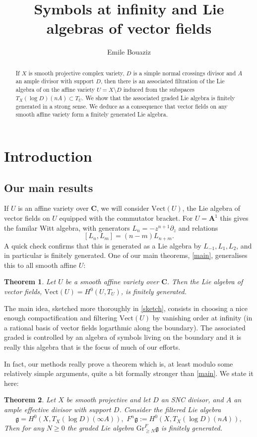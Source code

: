 \documentclass[12pt, oneside]{amsart}       %
\title[Symbols at infinity]{Symbols at infinity and Lie algebras of vector fields}
\author{Emile Bouaziz}
\newtheorem{theorem}{Theorem}[section]
\theoremstyle{remark}
\renewcommand{\geq}{\geqslant}
\newcommand{\aff}{\mathbf{A}}
\newcommand{\g}{\mathfrak{g}}
\begin{document}
\maketitle

\begin{abstract} If $X$ is smooth projective complex variety, $D$ is a simple normal crossings divisor and $A$ an ample divisor with support $D$, then there is an associated filtration of the Lie algebra of on the affine variety $U=X\setminus D$ induced from the subspaces $T_X(\log D)(nA)\subset T_U.$ We show that the associated graded Lie algebra is finitely generated in a strong sense. We deduce as a consequence that vector fields on any smooth affine variety form a finitely generated Lie algebra.
\end{abstract}

\section{Introduction} \subsection{Our main results} If $U$ is an affine variety over $\mathbf{C}$, we will consider $\mathrm{Vect}(U)$, the Lie algebra of vector fields on $U$ equipped with the commutator bracket. For $U=\aff^1$ this gives the familar Witt algebra, with generators $L_n=-z^{n+1}\partial_z$ and relations $$[L_n,L_m]=(n-m)L_{n+m}.$$ A quick check confirms that this is generated as a Lie algebra by $L_{-1},L_1,L_2$, and in particular is finitely generated. One of our main theorems, \ref{main}, generalises this to all smooth affine $U$: \begin{theorem}\label{main (intro)} Let $U$ be a smooth affine variety over $\mathbf C$. Then the Lie algebra of vector fields, $\mathrm{Vect}(U)=H^0(U,T_U)$, is finitely generated.
\end{theorem}
The main idea, sketched more thoroughly in \ref{sketch}, consists in choosing a nice enough compactification and filtering $\mathrm{Vect}(U)$ by vanishing order at infinity (in a rational basis of vector fields logarthmic along the boundary). The associated graded is controlled by an algebra of symbols living on the boundary and it is really this algebra that is the focus of much of our efforts.  

In fact, our methods really prove a theorem which is, at least modulo some relatively simple arguments, quite a bit formally stronger than \ref{main}. We state it here:  \begin{theorem}\label{real main - intro} Let $X$ be smooth projective and let $D$ an SNC divisor, and $A$ an ample effective divisor with support $D$. Consider the filtered Lie algebra $$\mathfrak{g}=H^0(X,T_X(\log D)(\infty A)),\,\,F^n\g:=H^0(X,T_X(\log D)(nA)),$$  Then for any $N\geq 0$ the graded Lie algebra $\mathrm{Gr}_{\geq N}^F\g$ is finitely generated. \end{theorem}
\end{document}
